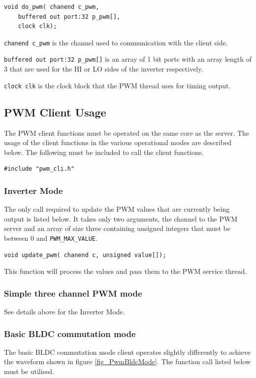 \begin{lstlisting}
void do_pwm( chanend c_pwm, 
	buffered out port:32 p_pwm[], 
	clock clk);
\end{lstlisting}

\verb=chanend c_pwm= is the channel used to communication with the client side.

\verb=buffered out port:32 p_pwm[]= is an array of 1 bit ports with an array length of 3 that are used for the HI or LO sides of the inverter respectively.

\verb=clock clk= is the clock block that the PWM thread uses for timing output.

\subsection{PWM Client Usage}
The PWM client functions must be operated on the same core as the server. The usage of the client functions in the various operational modes are described below. The following must be included to call the client functions.

\begin{lstlisting}
#include "pwm_cli.h"
\end{lstlisting}

\subsubsection{Inverter Mode}
The only call required to update the PWM values that are currently being output is listed below. It takes only two arguments, the channel to the PWM server and an array of size three containing unsigned integers that must be between 0 and \verb=PWM_MAX_VALUE=.

\begin{lstlisting}
void update_pwm( chanend c, unsigned value[]);
\end{lstlisting}

This function will process the values and pass them to the PWM service thread.

\subsubsection{Simple three channel PWM mode}

See details above for the Inverter Mode.

\subsubsection{Basic BLDC commutation mode}
The basic BLDC commutation mode client operates slightly differently to achieve the waveform shown in figure \ref{fig_PwmBldcMode}. The function call listed below must be utilised. 

